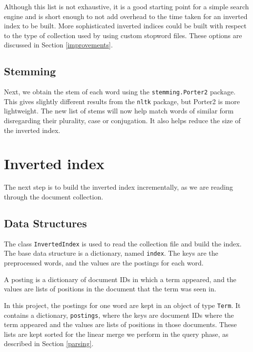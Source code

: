 \documentclass[11pt]{article}
\newenvironment{Figure}
  {\par\medskip\noindent\minipage{\linewidth}}
  {\endminipage\par\medskip}
\begin{document}
\begin{multicols}{2}
Although this list is not exhaustive, it is a good starting point for a simple search engine and is short enough to not add overhead to the time taken for an inverted index to be built. More sophisticated inverted indices could be built with respect to the type of collection used by using custom stopword files. These options are discussed in Section \ref{improvements}.

\subsection{Stemming}
Next, we obtain the stem of each word using the \verb!stemming.Porter2! package. This gives slightly different results from the \verb!nltk! package, but Porter2 is more lightweight. The new list of stems will now help match words of similar form disregarding their plurality, case or conjugation. It also helps reduce the size of the inverted index.

\section{Inverted index} \label{index}
The next step is to build the inverted index incrementally, as we are reading through the document collection.
\subsection{Data Structures} \label{datastructures}
The class \verb!InvertedIndex! is used to read the collection file and build the index. The base data structure is a dictionary, named \verb!index!. The keys are the preprocessed words, and the values are the postings for each word. 

A posting is a dictionary of document IDs in which a term appeared, and the values are lists of positions in the document that the term was seen in. 
%	

In this project, the postings for one word are kept in an object of type \verb!Term!. It contains a dictionary, \verb!postings!, where the keys are document IDs where the term appeared and the values are lists of positions in those documents. These lists are kept sorted for the linear merge we perform in the query phase, as described in Section \ref{parsing}. 


\end{multicols}
\end{document}
